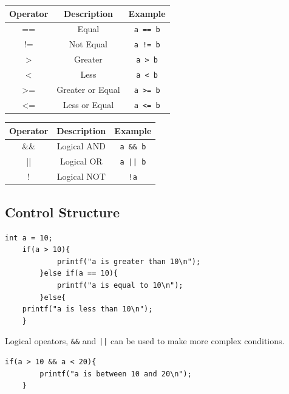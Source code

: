 \documentclass[a4paper, 10pt]{article}
\begin{document}
\vspace{1em}
\begin{minipage}{0.50\textwidth}
    \centering
    \begin{tabular}{|c|c|c|}
        \hline
        Operator & Description      & Example         \\
        \hline
        ==       & Equal            & \texttt{a == b} \\
        \hline
        !=       & Not Equal        & \texttt{a != b} \\
        \hline
        >        & Greater          & \texttt{a > b}  \\
        \hline
        <        & Less             & \texttt{a < b}  \\
        \hline
        >=       & Greater or Equal & \texttt{a >= b} \\
        \hline
        <=       & Less or Equal    & \texttt{a <= b} \\
        \hline
    \end{tabular}
\end{minipage}
\hfill
\begin{minipage}{0.45\textwidth}
    \centering
    \begin{tabular}{|c|c|c|}
        \hline
        Operator & Description & Example           \\
        \hline
        \&\&     & Logical AND & \texttt{a \&\& b} \\
        \hline
        ||       & Logical OR  & \texttt{a || b}   \\
        \hline
        !        & Logical NOT & \texttt{!a}       \\
        \hline
    \end{tabular}
\end{minipage}





\subsection{Control Structure}
\begin{lstlisting}[style=cStyle, caption={If-Else}]
    int a = 10;
    if(a > 10){
            printf("a is greater than 10\n");
        }else if(a == 10){
            printf("a is equal to 10\n");
        }else{
    printf("a is less than 10\n");
    }
    \end{lstlisting}
Logical opeators, \texttt{\&\&} and \texttt{||} can be used to make more complex conditions.
\begin{lstlisting}[style=cStyle, caption={Complex If-Else}]
    if(a > 10 && a < 20){
        printf("a is between 10 and 20\n");
    }
    \end{lstlisting}
\end{document}

